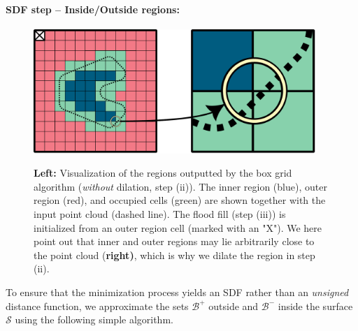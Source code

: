 \documentclass[12pt,openany]{book}
\theoremstyle{plainnormal}
\theoremstyle{remark}
\begin{document}
\paragraph{SDF step -- Inside/Outside regions:}
\begin{figure}[!b]
    \centering
    \includegraphics[width = 0.95\textwidth]{Figures/InnerOuter.pdf}\label{InnerOuter}
    \caption{\textbf{Left:} Visualization of the regions outputted by the box grid algorithm (\emph{without} dilation, step (ii)). The inner region (blue), outer region (red), and occupied cells (green) are shown together with the input point cloud (dashed line). The flood fill (step (iii)) is initialized from an outer region cell (marked with an "X"). We here point out that inner and outer regions may lie arbitrarily close to the point cloud (\textbf{right)}, which is why we dilate the region in step (ii).
}
\end{figure}
To ensure that the minimization process yields an SDF rather than an \emph{unsigned} distance function, we approximate the sets $\mathcal{B}^+$ outside and $\mathcal{B}^-$ inside the surface $\mathcal{S}$ using the following simple algorithm.
\end{document}
